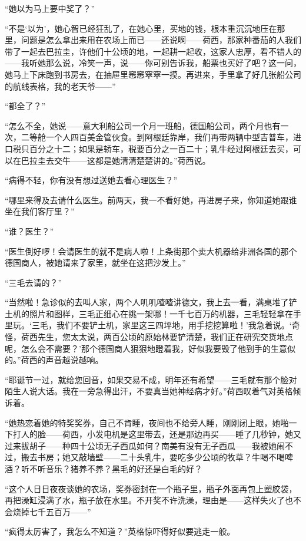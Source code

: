 \par “她以为马上要中奖了？”
\par “不是‘以为’，她心智已经狂乱了，在她心里，买地的钱，根本重沉沉地压在那里，问题是怎么拿出来用在农场上而已——还说啊——荷西，那家种番茄的人我们带了一起去巴拉圭，许他们十公顷的地，一起耕一起收，这家人忠厚，看不错人的——我听她那么说，冷笑一声，说——你可别告诉我，船票也买好了吧？这一问，她马上下床跑到书房去，在抽屉里窸窸窣窣一摸。再进来，手里拿了好几张船公司的航线表格，我的老天爷——”
\par “都全了？”
\par “怎么不全，她说——意大利船公司一个月一班船，德国船公司，两个月也有一次，二等舱一个人四百美金管伙食。到阿根廷靠岸，我们再带两辆中型吉普车，进口税只百分之十二；如果是轿车，税要百分之一百二十；乳牛经过阿根廷去买，可以在巴拉圭去交牛——这都是她清清楚楚讲的。”荷西说。
\par “病得不轻，你有没有想过送她去看心理医生？”
\par “哪里来得及去请什么医生。前两天，我一不看好她，再进房子来，你知道她跟谁坐在我们客厅里？”
\par “谁？医生？”
\par “医生倒好啰！会请医生的就不是病人啦！上条街那个卖大机器给非洲各国的那个德国商人，被她请来了家里，就坐在这把沙发上。”
\par “三毛去请的？”
\par “当然啦！急诊似的去叫人家，两个人叽叽喳喳讲德文，我上去一看，满桌堆了铲土机的照片和图样，三毛正细心在挑一架哪！一千七百万的机器，三毛轻轻拿在手里玩。‘三毛，我们不要铲土机，家里这三四坪地，用手挖挖算啦！’我急着说。‘奇怪，荷西先生，您太太说，两百公顷的原始林要铲清楚，我们正在研究交货地点呢，怎么会不需要？’那个德国商人狠狠地瞪着我，好似我要毁了他到手的生意似的。”荷西的声音越说越响。
\par “耶诞节一过，就给您回音，如果交易不成，明年还有希望——三毛就有那个脸对陌生人说大话。我在一旁急得出汗，不要真当她神经病才好。”荷西叹着气对英格倾诉着。
\par “她热恋着她的特奖奖券，自己不肯睡，夜间也不给旁人睡，刚刚闭上眼，她啪一下打人的脸——荷西，小发电机是这里带去，还是那边再买——睡了几秒钟，她又过来拔胡子——种四十公顷无子西瓜如何？南美有没有无子西瓜——我被她闹不过，搬去书房；她又敲墙壁——二十头乳牛，要吃多少公顷的牧草？牛喝不喝啤酒？听不听音乐？猪养不养？黑毛的好还是白毛的好？
\par “这个人日日夜夜谈她的农场，奖券密封在一个瓶子里，瓶子外面再包上塑胶袋，再把澡缸浸满了水，瓶子放在水里。不开奖不许洗澡，理由是——这样失火了也不会烧掉七千五百万——”
\par “疯得太厉害了，我怎么不知道？”英格惊吓得好似要逃走一般。
